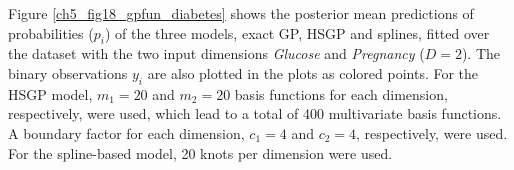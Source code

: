 \documentclass[onecolumn,a4paper,11pt]{article}
\begin{document}
Figure \ref{ch5_fig18_gpfun_diabetes} shows the posterior mean predictions of probabilities ($p_i$) of the three models, exact GP, HSGP and splines, fitted over the dataset with the two input dimensions \textit{Glucose} and \textit{Pregnancy} ($D=2$). The binary observations $y_i$ are also plotted in the plots as colored points. For the HSGP model, $m_1=20$ and $m_2=20$ basis functions for each dimension, respectively, were used, which lead to a total of 400 multivariate basis functions. A boundary factor for each dimension, $c_1=4$ and $c_2=4$, respectively, were used. For the spline-based model, 20 knots per dimension were used.
%
\begin{figure}
\centering
{}

\end{figure}
\end{document}
